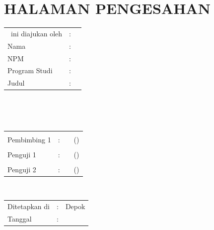 %
%
%

\chapter*{HALAMAN PENGESAHAN}

\vspace*{0.4cm}
\noindent

\noindent
\begin{tabular}{ll p{9cm}}
	\type~ini diajukan oleh & : &            \\
	Nama                    & : & \penulis \\
	NPM                     & : & \npm     \\
	Program Studi           & : & \program \\
	Judul \type             & : & \judul   \\
\end{tabular} \\

\vspace*{1.0cm}

\noindent {}\\[0.2cm]

\begin{center}
\end{center}

\vspace*{0.3cm}

\begin{tabular}{l l l l }
	             &   &                   &                   \\
	Pembimbing 1 & : & \pembimbingSatu & (\hspace*{3.0cm}) \\
	             &   &                   &                   \\
	Penguji 1    & : & \pengujiSatu    & (\hspace*{3.0cm}) \\
	             &   &                   &                   \\
	Penguji 2    & : & \pengujiDua     & (\hspace*{3.0cm}) \\
\end{tabular}\\

\vspace*{2.0cm}

\begin{tabular}{ll l}
	Ditetapkan di & : & Depok           \\
	Tanggal       & : & \tanggalLulus \\
\end{tabular}


\newpage
